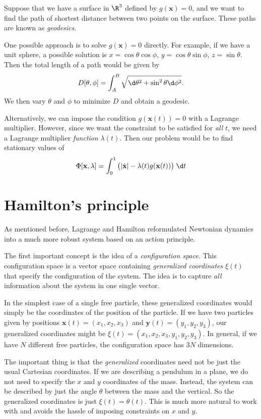 \documentclass[a4paper]{article}
\begin{document}
\begin{eg}[Geodesics]
  Suppose that we have a surface in $\R^3$ defined by $g(\mathbf{x}) = 0$, and we want to find the path of shortest distance between two points on the surface. These paths are known as \emph{geodesics}.

  One possible approach is to solve $g(\mathbf{x}) = 0$ directly. For example, if we have a unit sphere, a possible solution is $x = \cos\theta \cos\phi$, $y = \cos\theta\sin\phi$, $z = \sin\theta$. Then the total length of a path would be given by
  \[
    D[\theta, \phi] = \int_A^B \sqrt{\d \theta^2 + \sin^2 \theta \d \phi^2}.
  \]
  We then vary $\theta$ and $\phi$ to minimize $D$ and obtain a geodesic.

  Alternatively, we can impose the condition $g(\mathbf{x}(t)) = 0$ with a Lagrange multiplier. However, since we want the constraint to be satisfied for \emph{all} $t$, we need a Lagrange multiplier \emph{function} $\lambda(t)$. Then our problem would be to find stationary values of
  \[
    \Phi[\mathbf{x}, \lambda] = \int_0^1 \big(|\dot{\mathbf{x}}| - \lambda(t) g(\mathbf{x}(t))\big)\;\d t
  \]
\end{eg}
\section{Hamilton's principle}
\label{sec:hamilton}
As mentioned before, Lagrange and Hamilton reformulated Newtonian dynamics into a much more robust system based on an action principle.

The first important concept is the idea of a \emph{configuration space}. This configuration space is a vector space containing \emph{generalized coordinates} $\xi(t)$ that specify the configuration of the system. The idea is to capture \emph{all} information about the system in one single vector.

In the simplest case of a single free particle, these generalized coordinates would simply be the coordinates of the position of the particle. If we have two particles given by positions $\mathbf{x}(t) = (x_1, x_2, x_3)$ and $\mathbf{y}(t) = (y_1, y_2, y_3)$, our generalized coordinates might be $\xi(t) = (x_1, x_2, x_3, y_1, y_2, y_3)$. In general, if we have $N$ different free particles, the configuration space has $3N$ dimensions.

The important thing is that the \emph{generalized} coordinates need not be just the usual Cartesian coordinates. If we are describing a pendulum in a plane, we do not need to specify the $x$ and $y$ coordinates of the mass. Instead, the system can be described by just the angle $\theta$ between the mass and the vertical. So the generalized coordinates is just $\xi(t) = \theta(t)$. This is much more natural to work with and avoids the hassle of imposing constraints on $x$ and $y$.
\end{document}
